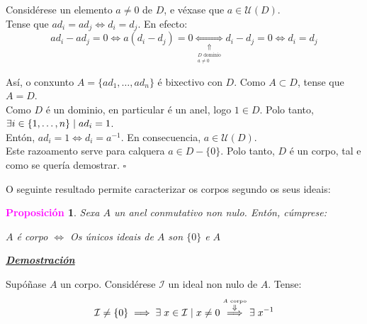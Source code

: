 \documentclass[twoside]{report}
\newcommand{\magbf}[1]{\textcolor{magenta}{\textbf{#1}}} %
\theoremstyle{mystyle}
\newtheorem{prop}{\magbf{Proposición}}[chapter]
\newenvironment{proposition}
{\begin{mdframed}[linecolor = magenta,backgroundcolor = classicrose, linewidth = 2mm]\begin{prop}}
{\end{prop}\end{mdframed}}
\begin{document}
\noindent Considérese un elemento $a \neq 0$ de $D$, e véxase que $a \in \mathcal{U}(D)$.\\

\noindent Tense que $ad_{i} = ad_{j} \Longleftrightarrow d_{i} = d_{j}$. En efecto:
$$ad_{i} - ad_{j} = 0 \Longleftrightarrow a(d_{i} - d_{j}) = 0 \underset{\underset{
\substack{
D \text{ dominio} \\ a \neq 0
}
}{\Uparrow}}{\Longleftrightarrow} d_{i} - d_{j} = 0 \Longleftrightarrow d_{i} = d_{j}$$

\noindent Así, o conxunto $A = \{ad_{1}, \ldots, ad_{n}\}$ é bixectivo con $D$. Como $A \subset D$, tense que $A = D$.\\

\noindent Como $D$ é un dominio, en particular é un anel, logo $1 \in D$. Polo tanto, $\exists i \in \{1, \ldots, n\} \hspace{1mm} | \hspace{1mm} ad_{i} = 1$. \\

\noindent Entón, $ad_{i} = 1 \Longleftrightarrow d_{i} = a^{-1}$. En consecuencia, $a \in \mathcal{U}(D)$.\\

\noindent Este razoamento serve para calquera $a \in D-\{0\}$. Polo tanto, $D$ é un corpo, tal e como se quería demostrar. $\square$ \\

\vspace{3mm}

\noindent O seguinte resultado permite caracterizar os corpos segundo os seus ideais:\\

\begin{proposition} \label{prop2.16}
Sexa $A$ un anel conmutativo non nulo. Entón, cúmprese:
\begin{center}
    $A$ é corpo $\Longleftrightarrow$ Os únicos ideais de $A$ son $\{0\}$ e $A$  
\end{center}
\end{proposition}

\vspace{2mm}

\noindent \textbf{\textit{\underline{Demostración}}}

\vspace{2mm}

\noindent {} Supóñase $A$ un corpo. Considérese $\mathcal{I}$ un ideal non nulo de $A$. Tense:
$$\mathcal{I} \neq \{0\} \implies \exists \hspace{1mm} x \in \mathcal{I} \hspace{1mm} | \hspace{1mm} x \neq 0 \overset{\overset{A \text{ corpo}}{\Downarrow}}{\implies} \exists \hspace{1mm} x^{-1}$$
\end{document}

